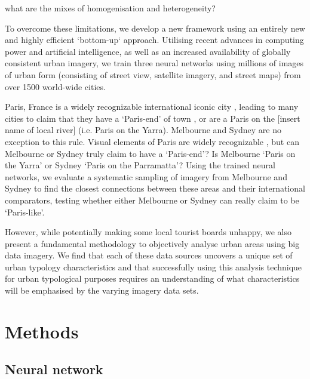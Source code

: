 \documentclass[10pt,letterpaper]{article}
\begin{document}
what are the mixes of homogenisation and heterogeneity?



To overcome these limitations, we develop a new framework using an entirely new and highly efficient `bottom-up` approach. Utilising recent advances in computing power and artificial intelligence, as well as an increased availability of globally consistent urban imagery, we train three neural networks using millions of images of urban form (consisting of street view, satellite imagery, and street maps) from over 1500 world-wide cities. 

Paris, France is a widely recognizable international iconic city \cite{Anholt2006}, leading to many cities to claim that they have a `Paris-end' of town \cite{Williams2010}, or are a Paris on the [insert name of local river] \cite{Wilden2013} (i.e. Paris on the Yarra). Melbourne and Sydney are no exception to this rule. Visual elements of Paris are widely recognizable \cite{Doersch2012}, but can Melbourne or Sydney truly claim to have a `Paris-end'? Is Melbourne `Paris on the Yarra' or Sydney `Paris on the Parramatta'? Using the trained neural networks, we evaluate a systematic sampling of imagery from Melbourne and Sydney to find the closest connections between these areas and their international comparators, testing whether either Melbourne or Sydney can really claim to be `Paris-like'.

However, while potentially making some local tourist boards unhappy, we also present a fundamental methodology to objectively analyse urban areas using big data imagery. We find that each of these data sources uncovers a unique set of urban typology characteristics and that successfully using this analysis technique for urban typological purposes requires an understanding of what characteristics will be emphasised by the varying imagery data sets.





\section*{Methods}\label{sec:methods}
\subsection*{Neural network}\label{sec:methods1}
\end{document}
